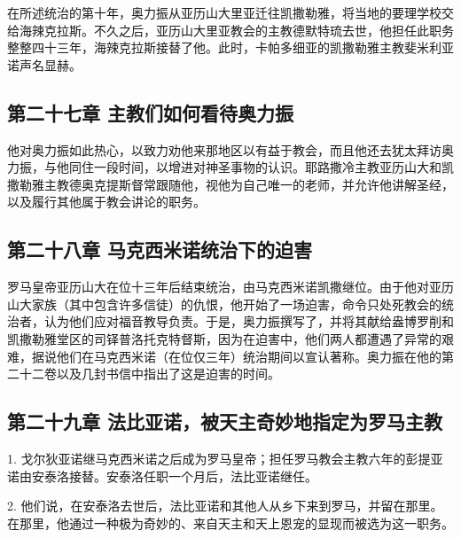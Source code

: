 在所述统治的第十年，奥力振从亚历山大里亚迁往凯撒勒雅，将当地的要理学校交给海辣克拉斯。不久之后，亚历山大里亚教会的主教德默特琉去世，他担任此职务整整四十三年，海辣克拉斯接替了他。此时，卡帕多细亚的凯撒勒雅主教斐米利亚诺声名显赫。\par


\subsection{第二十七章  主教们如何看待奥力振}

他对奥力振如此热心，以致力劝他来那地区以有益于教会，而且他还去犹太拜访奥力振，与他同住一段时间，以增进对神圣事物的认识。耶路撒冷主教亚历山大和凯撒勒雅主教德奥克提斯督常跟随他，视他为自己唯一的老师，并允许他讲解圣经，以及履行其他属于教会讲论的职务。\par


\subsection{第二十八章  马克西米诺统治下的迫害}

罗马皇帝亚历山大在位十三年后结束统治，由马克西米诺凯撒继位。由于他对亚历山大家族（其中包含许多信徒）的仇恨，他开始了一场迫害，命令只处死教会的统治者，认为他们应对福音教导负责。于是，奥力振撰写了，并将其献给盎博罗削和凯撒勒雅堂区的司铎普洛托克特督斯，因为在迫害中，他们两人都遭遇了异常的艰难，据说他们在马克西米诺（在位仅三年）统治期间以宣认著称。奥力振在他的第二十二卷以及几封书信中指出了这是迫害的时间。\par


\subsection{第二十九章  法比亚诺，被天主奇妙地指定为罗马主教}

1. 戈尔狄亚诺继马克西米诺之后成为罗马皇帝；担任罗马教会主教六年的彭提亚诺由安泰洛接替。安泰洛任职一个月后，法比亚诺继任。\par

2. 他们说，在安泰洛去世后，法比亚诺和其他人从乡下来到罗马，并留在那里。在那里，他通过一种极为奇妙的、来自天主和天上恩宠的显现而被选为这一职务。\par

